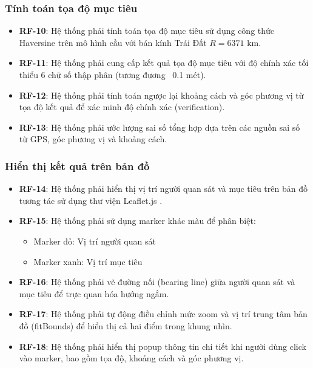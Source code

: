 \subsubsection{Tính toán tọa độ mục tiêu}
\begin{itemize}
    \item \textbf{RF-10}: Hệ thống phải tính toán tọa độ mục tiêu sử dụng công thức Haversine \cite{sinnot1984virtues} trên mô hình cầu với bán kính Trái Đất $R = 6371$ km.
    \item \textbf{RF-11}: Hệ thống phải cung cấp kết quả tọa độ mục tiêu với độ chính xác tối thiểu 6 chữ số thập phân (tương đương ~0.1 mét).
    \item \textbf{RF-12}: Hệ thống phải tính toán ngược lại khoảng cách và góc phương vị từ tọa độ kết quả để xác minh độ chính xác (verification).
    \item \textbf{RF-13}: Hệ thống phải ước lượng sai số tổng hợp dựa trên các nguồn sai số từ GPS, góc phương vị và khoảng cách.
\end{itemize}

\subsubsection{Hiển thị kết quả trên bản đồ}
\begin{itemize}
    \item \textbf{RF-14}: Hệ thống phải hiển thị vị trí người quan sát và mục tiêu trên bản đồ tương tác sử dụng thư viện Leaflet.js \cite{leafletjs}.
    \item \textbf{RF-15}: Hệ thống phải sử dụng marker khác màu để phân biệt:
    \begin{itemize}
        \item Marker đỏ: Vị trí người quan sát
        \item Marker xanh: Vị trí mục tiêu
    \end{itemize}
    \item \textbf{RF-16}: Hệ thống phải vẽ đường nối (bearing line) giữa người quan sát và mục tiêu để trực quan hóa hướng ngắm.
    \item \textbf{RF-17}: Hệ thống phải tự động điều chỉnh mức zoom và vị trí trung tâm bản đồ (fitBounds) để hiển thị cả hai điểm trong khung nhìn.
    \item \textbf{RF-18}: Hệ thống phải hiển thị popup thông tin chi tiết khi người dùng click vào marker, bao gồm tọa độ, khoảng cách và góc phương vị.
\end{itemize}


